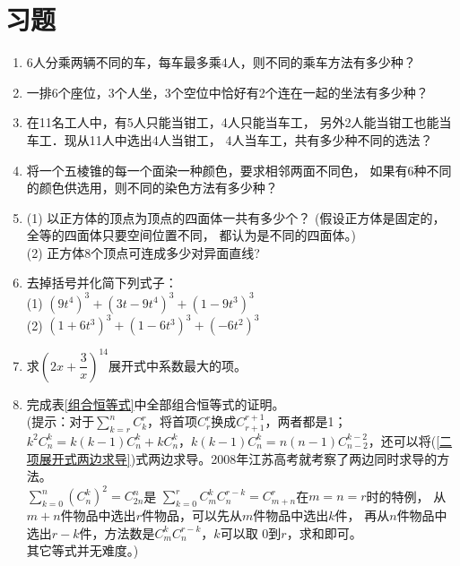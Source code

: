 \section{习题}
\begin{enumerate}[label={\textbf{\thechapter.\arabic*}},leftmargin=
    \inteval{\myenumleftmargin}pt]
    
\item 6人分乘两辆不同的车，每车最多乘4人，则不同的乘车方法有多少种？

\item 一排6个座位，3个人坐，3个空位中恰好有2个连在一起的坐法有多少种？

\item 在11名工人中，有5人只能当钳工，4人只能当车工，
另外2人能当钳工也能当车工．现从11人中选出4人当钳工，
4人当车工，共有多少种不同的选法？

\item 将一个五棱锥的每一个面染一种颜色，要求相邻两面不同色，
如果有6种不同的颜色供选用，则不同的染色方法有多少种？

\item (1) 以正方体的顶点为顶点的四面体一共有多少个？
(假设正方体是固定的，全等的四面体只要空间位置不同，
都认为是不同的四面体。) \\
(2) 正方体8个顶点可连成多少对异面直线?

\item 去掉括号并化简下列式子：\\
(1) $ \left(9t^4\right)^3+\left(3t-9t^4\right)^3+
\left(1-9t^3\right)^3 $ \\
(2) $ \left(1+6t^3\right)^3+\left(1-6t^3\right)^3+
\left(-6t^2\right)^3 $

\item 求$ \left(2x+\dfrac{3}{x}\right)^{14} $展开式中系数最大的项。

\item 完成表\ref{组合恒等式}中全部组合恒等式的证明。\\
(提示：对于$ \sum\limits_{k=r}^{n} C_k^r $，将首项$ C_r^r $换成$ C_{r+1}^{r+1} $，两者都是1；\\
$ k^2C_n^k=k(k-1)C_n^k+kC_n^k $，$ k(k-1)C_n^k=n(n-1)C_{n-2}^{k-2} $，还可以将(\ref{二项展开式两边求导})式两边求导。2008年江苏高考就考察了两边同时求导的方法。\\
$\sum\limits_{k=0}^{n} \left( C_{n}^k\right) ^2=C_{2n}^n$是
$ \sum\limits_{k=0}^{r}C_m^kC_n^{r-k}=C_{m+n}^r $在$m=n=r$时的特例，
从$m+n$件物品中选出$r$件物品，可以先从$m$件物品中选出$k$件，
再从$n$件物品中选出$r-k$件，方法数是$ C_m^kC_n^{r-k} $，$k$可以取
0到$r$，求和即可。\\
其它等式并无难度。)


\end{enumerate}
